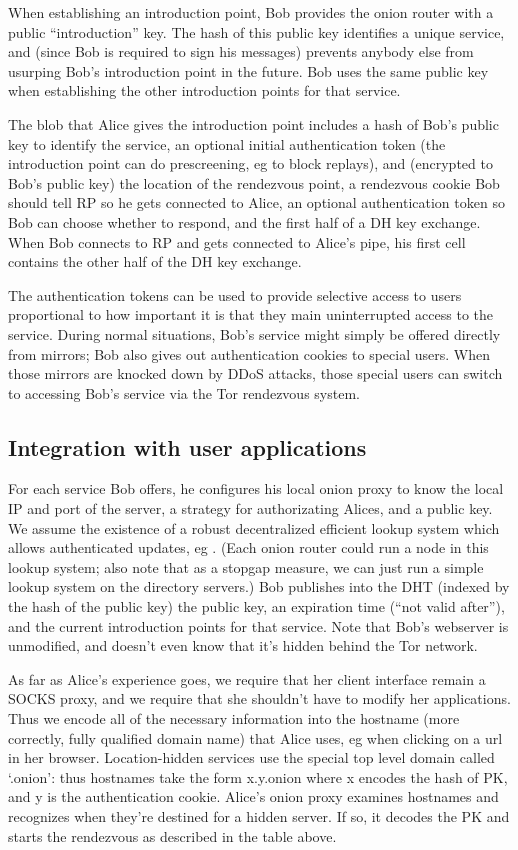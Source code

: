 \documentclass[times,10pt,twocolumn]{article}
\begin{document}
When establishing an introduction point, Bob provides the onion router
with a public ``introduction'' key.  The hash of this public key
identifies a unique service, and (since Bob is required to sign his
messages) prevents anybody else from usurping Bob's introduction point
in the future. Bob uses the same public key when establishing the other
introduction points for that service.

The blob that Alice gives the introduction point includes a hash of Bob's
public key to identify the service, an optional initial authentication
token (the introduction point can do prescreening, eg to block replays),
and (encrypted to Bob's public key) the location of the rendezvous point,
a rendezvous cookie Bob should tell RP so he gets connected to
Alice, an optional authentication token so Bob can choose whether to respond,
and the first half of a DH key exchange. When Bob connects to RP
and gets connected to Alice's pipe, his first cell contains the
other half of the DH key exchange.

The authentication tokens can be used to provide selective access to users
proportional to how important it is that they main uninterrupted access
to the service. During normal situations, Bob's service might simply be
offered directly from mirrors; Bob also gives out authentication cookies
to special users. When those mirrors are knocked down by DDoS attacks,
those special users can switch to accessing Bob's service via the Tor
rendezvous system.

\subsection{Integration with user applications}

For each service Bob offers, he configures his local onion proxy to know
the local IP and port of the server, a strategy for authorizating Alices,
and a public key. We assume the existence of a robust decentralized
efficient lookup system which allows authenticated updates, eg
\cite{cfs:sosp01}. (Each onion router could run a node in this lookup
system; also note that as a stopgap measure, we can just run a simple
lookup system on the directory servers.)  Bob publishes into the DHT
(indexed by the hash of the public key) the public key, an expiration
time (``not valid after''), and the current introduction points for that
service. Note that Bob's webserver is unmodified, and doesn't even know
that it's hidden behind the Tor network.

As far as Alice's experience goes, we require that her client interface
remain a SOCKS proxy, and we require that she shouldn't have to modify
her applications. Thus we encode all of the necessary information into
the hostname (more correctly, fully qualified domain name) that Alice
uses, eg when clicking on a url in her browser. Location-hidden services
use the special top level domain called `.onion': thus hostnames take the
form x.y.onion where x encodes the hash of PK, and y is the authentication
cookie. Alice's onion proxy examines hostnames and recognizes when they're
destined for a hidden server. If so, it decodes the PK and starts the
rendezvous as described in the table above.
\end{document}

